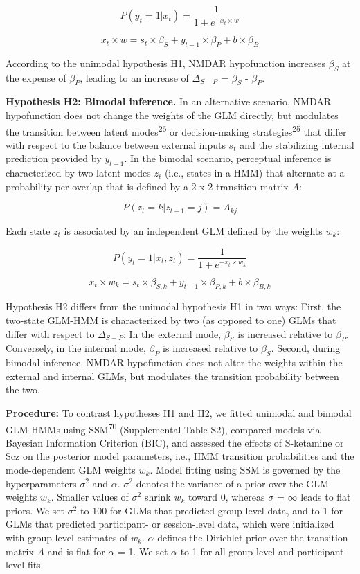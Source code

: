 \documentclass[
]{article}
\begin{document}
\[
P(y_t = 1 | x_t) = \frac{1}{1 + e^{-x_t \times w}} 
\]

\[
x_t \times w =  s_t \times \beta_S + y_{t-1} \times \beta_P  + b \times \beta_B  
\]

According to the unimodal hypothesis H1, NMDAR hypofunction increases
\(\beta_S\) at the expense of \(\beta_P\), leading to an increase of
\(\Delta_{S-P}\) = \(\beta_S\) - \(\beta_P\).

\textbf{Hypothesis H2: Bimodal inference.} In an alternative scenario,
NMDAR hypofunction does not change the weights of the GLM directly, but
modulates the transition between latent modes\textsuperscript{26} or
decision-making strategies\textsuperscript{25} that differ with respect
to the balance between external inputs \(s_t\) and the stabilizing
internal prediction provided by \(y_{t-1}\). In the bimodal scenario,
perceptual inference is characterized by two latent modes \(z_t\) (i.e.,
states in a HMM) that alternate at a probability per overlap that is
defined by a 2 x 2 transition matrix \(A\):

\[
P(z_t = k|z_{t-1} = j) = A_{kj} 
\]

Each state \(z_t\) is associated by an independent GLM defined by the
weights \(w_k\):

\[
P(y_t = 1 | x_t, z_t) = \frac{1}{1 + e^{-x_t \times w_k}} 
\]

\[
x_t \times w_k =  s_t \times \beta_{S,k} + y_{t-1} \times \beta_{P,k}  + b \times \beta_{B,k}  
\]

Hypothesis H2 differs from the unimodal hypothesis H1 in two ways:
First, the two-state GLM-HMM is characterized by two (as opposed to one)
GLMs that differ with respect to \(\Delta_{S-P}\): In the external mode,
\(\beta_S\) is increased relative to \(\beta_P\). Conversely, in the
internal mode, \(\beta_P\) is increased relative to \(\beta_S\). Second,
during bimodal inference, NMDAR hypofunction does not alter the weights
within the external and internal GLMs, but modulates the transition
probability between the two.

\textbf{Procedure:} To contrast hypotheses H1 and H2, we fitted unimodal
and bimodal GLM-HMMs using SSM\textsuperscript{70} (Supplemental Table
S2), compared models via Bayesian Information Criterion (BIC), and
assessed the effects of S-ketamine or Scz on the posterior model
parameters, i.e., HMM transition probabilities and the mode-dependent
GLM weights \(w_k\). Model fitting using SSM is governed by the
hyperparameters \(\sigma^2\) and \(\alpha\). \(\sigma^2\) denotes the
variance of a prior over the GLM weights \(w_k\). Smaller values of
\(\sigma^2\) shrink \(w_k\) toward 0, whereas \(\sigma\) = \(\infty\)
leads to flat priors. We set \(\sigma^2\) to 100 for GLMs that predicted
group-level data, and to 1 for GLMs that predicted participant- or
session-level data, which were initialized with group-level estimates of
\(w_k\). \(\alpha\) defines the Dirichlet prior over the transition
matrix \(A\) and is flat for \(\alpha\) = 1. We set \(\alpha\) to 1 for
all group-level and participant-level fits.
\end{document}
